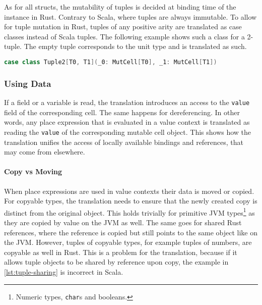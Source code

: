 As for all structs, the mutability of tuples is decided at binding time of the
instance in Rust. Contrary to Scala, where tuples are always immutable. To allow
for tuple mutation in Rust, tuples of any positive arity are translated as case
classes instead of Scala tuples. The following example shows  such a class for a
2-tuple. The empty tuple corresponds to the unit type and is translated as such.

\begin{lstlisting}[language=Scala, style=short]
case class Tuple2[T0, T1](_0: MutCell[T0], _1: MutCell[T1])
\end{lstlisting}

\subsubsection{Using Data}

If a field or a variable is read, the translation introduces an access to the
\passthrough{\lstinline!value!} field of the corresponding cell. The same
happens for dereferencing. In other words, any place expression that is
evaluated in a value context is translated as reading the
\passthrough{\lstinline!value!} of the corresponding mutable cell object. This
shows how the translation unifies the access of locally available bindings and
references, that may come from elsewhere.

\paragraph{Copy vs Moving}

When place expressions are used in value contexts their data is  moved or
copied. For copyable types, the translation needs to ensure that the newly
created copy is distinct from the original object. This holds trivially for
primitive JVM types\footnote{Numeric types, \lstinline!char!s and booleans.} as
they are copied by value on the JVM as well. The same goes for shared Rust
references, where the reference is copied but still points to the same object
like on the JVM. However, tuples of copyable types, for example tuples of
numbers, are copyable as well in Rust. This is a problem for the translation,
because if it allows tuple objects to be shared by reference upon copy, the
example in \autoref{lst:tuple-sharing} is incorrect in Scala.

